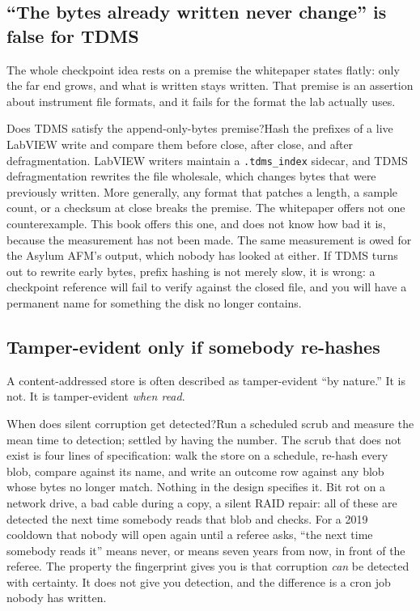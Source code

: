 \subsection{``The bytes already written never change'' is false for TDMS}

The whole checkpoint idea rests on a premise the whitepaper states flatly: only the far end grows, and what is written stays written. That premise is an assertion about instrument file formats, and it fails for the format the lab actually uses.

\begin{Open}{Does TDMS satisfy the append-only-bytes premise?}{Hash the prefixes of a live LabVIEW write and compare them before close, after close, and after defragmentation.}
LabVIEW writers maintain a \texttt{.tdms\_index} sidecar, and TDMS defragmentation rewrites the file wholesale, which changes bytes that were previously written. More generally, any format that patches a length, a sample count, or a checksum at close breaks the premise. The whitepaper offers not one counterexample. This book offers this one, and does not know how bad it is, because the measurement has not been made. The same measurement is owed for the Asylum AFM's output, which nobody has looked at either. If TDMS turns out to rewrite early bytes, prefix hashing is not merely slow, it is wrong: a checkpoint reference will fail to verify against the closed file, and you will have a permanent name for something the disk no longer contains.
\end{Open}

\subsection{Tamper-evident only if somebody re-hashes}

A content-addressed store is often described as tamper-evident ``by nature.'' It is not. It is tamper-evident \emph{when read}.

\begin{Open}{When does silent corruption get detected?}{Run a scheduled scrub and measure the mean time to detection; settled by having the number.}
The scrub that does not exist is four lines of specification: walk the store on a schedule, re-hash every blob, compare against its name, and write an outcome row against any blob whose bytes no longer match. Nothing in the design specifies it. Bit rot on a network drive, a bad cable during a copy, a silent RAID repair: all of these are detected the next time somebody reads that blob and checks. For a 2019 cooldown that nobody will open again until a referee asks, ``the next time somebody reads it'' means never, or means seven years from now, in front of the referee. The property the fingerprint gives you is that corruption \emph{can} be detected with certainty. It does not give you detection, and the difference is a cron job nobody has written.
\end{Open}

